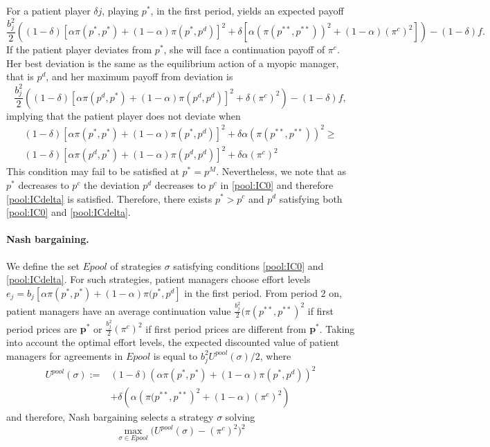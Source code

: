 \documentclass[]{article}
\newcommand{\p}{\mathbf p}
\begin{document}
For a patient player $\delta j$, playing $p^*$, in the first period, yields an expected payoff
%
\[
\frac{b_j^2}{2}\left((1-\delta)[\alpha \pi(p^*,p^*)+(1-\alpha)\pi(p^{*},p^d)]^2 + \delta [ \alpha (\pi(p^{**},p^{**}))^2 + (1-\alpha) (\pi^c)^2]\right) - (1-\delta) f.
\]
If the patient player deviates from $p^*$, she will face a continuation payoff of $\pi^c$. Her best deviation is the same as the equilibrium action of a myopic manager, that is $p^d$, and her maximum payoff from deviation is
%
\[
\frac{b_j^2}{2}\left((1-\delta)[\alpha \pi(p^d,p^*)+ (1-\alpha) \pi(p^{d},p^d)]^2 + \delta (\pi^c)^2\right) - (1-\delta) f,
\]
implying that the patient player does not deviate when
\begin{equation}
  \begin{split}\label{pool:ICdelta}
    (1-\delta)[\alpha \pi(p^*,p^*)+(1-\alpha)\pi(p^{*},p^d)]^2 + \delta \alpha (\pi(p^{**},p^{**}))^2 \geq \\
(1-\delta)[\alpha \pi(p^d,p^*)+ (1-\alpha) \pi(p^{d},p^d)]^2 + \delta \alpha (\pi^c)^2
  \end{split}
\end{equation}
%
This condition may fail to be satisfied at $p^*=p^M$. Nevertheless, we note that as $p^*$ decreases to $ p^c$ the deviation $p^d$ decreases to $p^c$ in \eqref{pool:IC0} and therefore \eqref{pool:ICdelta} is satisfied. Therefore, there exists $p^*>p^c$ and $p^d$ satisfying both \eqref{pool:IC0} and \eqref{pool:ICdelta}. 
%   
%    
\paragraph{Nash bargaining.} We define the set $Epool$ of strategies $\sigma$ satisfying conditions \eqref{pool:IC0} and \eqref{pool:ICdelta}. For such strategies, patient managers choose effort levels $e_j=b_j  [\alpha \pi(p^*,p^*) +(1-\alpha) \pi(p^*,p^d]$ in the first period. From period $2$ on, patient managers have an average continuation value $\frac{b_j^2}{2}(\pi(p^{**},p^{**})^2$ if first period prices are $\p^*$ or $\frac{b_j^2}{2}(\pi^c)^2$ if first period prices are different from $\p^*$. Taking into account the optimal effort levels, the expected discounted value of patient managers for agreements in $Epool$ is equal to $b_j^2 U^{pool}(\sigma)/2$, where 
%
\begin{equation*}
  \begin{split}
    U^{pool}(\sigma):= &(1-\delta)\left(\alpha\pi(p^*,p^*)+(1-\alpha)\pi(p^*,p^d)\right)^2\\
&+\delta\left(\alpha\left(\pi(p^{**},p^{**}\right)^2+(1-\alpha)(\pi^c)^2\right)
  \end{split}
\end{equation*}
%
and therefore, Nash bargaining selects a strategy $\sigma$ solving
%
\begin{equation}\label{Nash:pool}
     \max_{\sigma\in Epool} \Big(U^{pool}(\sigma)-(\pi^c)^2\Big)^2
\end{equation}
\end{document}
